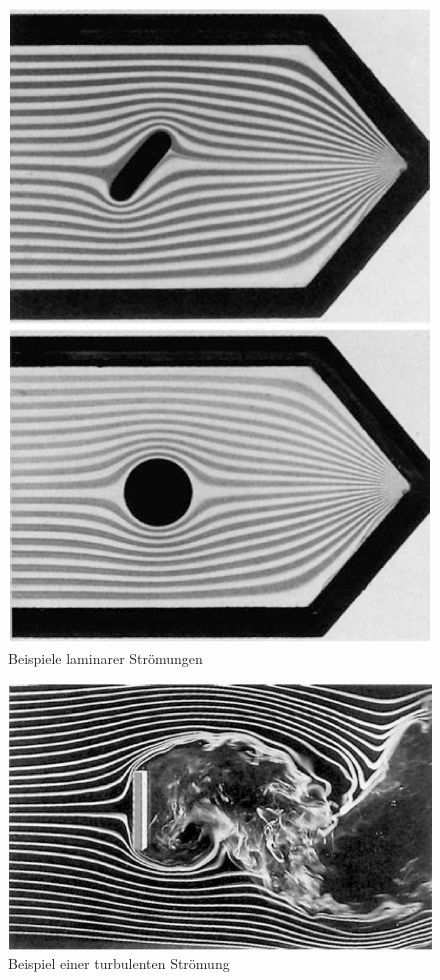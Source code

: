 \begin{figure}
        \includegraphics[width=.9\textwidth]{images/8-5}
\caption{ Beispiele laminarer Strömungen }
\label{fig:8-5}
\end{figure}

\begin{figure}
        \includegraphics[width=.9\textwidth]{images/8-6}
\caption{ Beispiel einer turbulenten Strömung }
\label{fig:8-6}
\end{figure}

